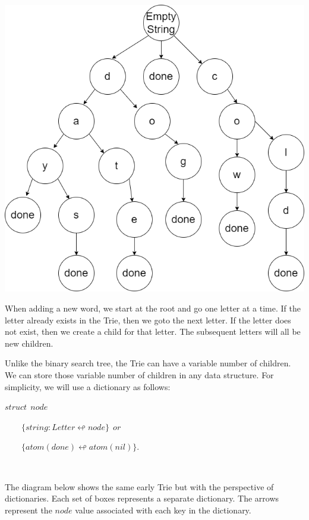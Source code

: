 \documentclass[
]{book}
\begin{document}
\includegraphics{images/trie1.drawio.png}

When adding a new word, we start at the root and go one letter at a time. If the letter already exists in the Trie, then we goto the next letter. If the letter does not exist, then we create a child for that letter. The subsequent letters will all be new children.

Unlike the binary search tree, the Trie can have a variable number of children. We can store those variable number of children in any data structure. For simplicity, we will use a dictionary as follows:

\begin{formulabox}
\(struct ~ ~ node\)

\(\quad \quad \lbrace string:Letter \looparrowleft node \rbrace ~ ~ or\)

\(\quad \quad \lbrace atom(done) \looparrowleft atom(nil) \rbrace.\)

\end{formulabox}

\(\nonumber\)

The diagram below shows the same early Trie but with the perspective of dictionaries. Each set of boxes represents a separate dictionary. The arrows represent the \(node\) value associated with each key in the dictionary.
\end{document}
